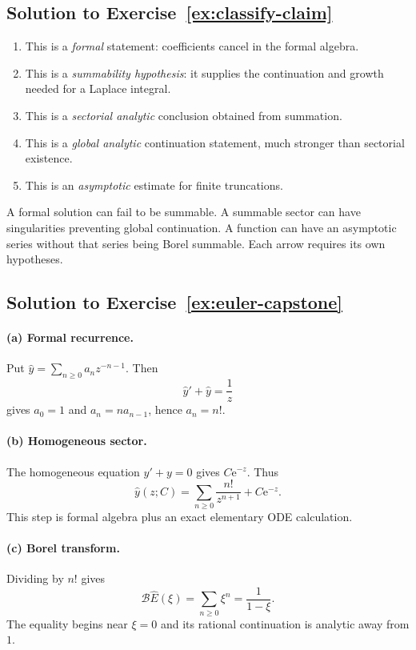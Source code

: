 \documentclass[11pt,oneside]{book}
\theoremstyle{definition}
\theoremstyle{remark}
\newcommand{\Borel}{\mathcal{B}}
\newcommand{\e}{\mathrm{e}}
\begin{document}
\subsection*{Solution to Exercise~\ref{ex:classify-claim}}

\begin{enumerate}[label=(\alph*)]
\item This is a \emph{formal} statement: coefficients cancel in the formal
algebra.
\item This is a \emph{summability hypothesis}: it supplies the continuation and
growth needed for a Laplace integral.
\item This is a \emph{sectorial analytic} conclusion obtained from summation.
\item This is a \emph{global analytic} continuation statement, much stronger
than sectorial existence.
\item This is an \emph{asymptotic} estimate for finite truncations.
\end{enumerate}
A formal solution can fail to be summable. A summable sector can have singularities
preventing global continuation. A function can have an asymptotic series without
that series being Borel summable. Each arrow requires its own hypotheses.

\subsection*{Solution to Exercise~\ref{ex:euler-capstone}}

\paragraph{(a) Formal recurrence.}
Put $\widehat y=\sum_{n\ge0}a_nz^{-n-1}$. Then
\[
  \widehat y'+\widehat y=\frac1z
\]
gives $a_0=1$ and $a_n=n a_{n-1}$, hence $a_n=n!$.

\paragraph{(b) Homogeneous sector.}
The homogeneous equation $y'+y=0$ gives $C\e^{-z}$. Thus
\[
  \widehat y(z;C)=\sum_{n\ge0}\frac{n!}{z^{n+1}}+C\e^{-z}.
\]
This step is formal algebra plus an exact elementary ODE calculation.

\paragraph{(c) Borel transform.}
Dividing by $n!$ gives
\[
  \Borel\widehat E(\xi)=\sum_{n\ge0}\xi^n=\frac1{1-\xi}.
\]
The equality begins near $\xi=0$ and its rational continuation is analytic away
from $1$.
\end{document}
